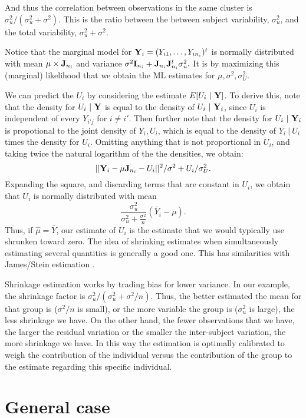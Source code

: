 And thus the correlation between observations in the same cluster is
$\sigma^2_u / (\sigma^2_u + \sigma^2)$. This is the ratio between
the between subject variability, $\sigma^2_u$, and the total variability,
$\sigma^2_u + \sigma^2$. 

Notice that the marginal model for $\mathbf{Y}_i = (Y_{i1}, \ldots, Y_{in_i})^t$ is
normally distributed with mean $\mu \times \mathbf{J}_{n_i}$ and variance 
$
\sigma^2 \mathbf{I}_{n_i} + \mathbf{J}_{n_i} \mathbf{J}_{n_i}^t \sigma^2_{u}. 
$
It is by maximizing this (marginal) likelihood that we obtain the ML estimates 
for $\mu, \sigma^2, \sigma^2_U$. 

We can predict the $U_i$ by considering the estimate $E[U_i ~|~ \mathbf{Y}]$. To derive
this, note that the density for $U_i ~|~ \mathbf{Y}$ is equal to the density 
of $U_i ~|~ \mathbf{Y}_i$, since $U_i$ is independent of every $Y_{i'j}$ for $i \neq i'$. 
Then further note that the density for $U_i ~|~ \mathbf{Y}_i$ is propotional to the
joint density of $Y_i, U_i$, which is equal to the density of $Y_i ~|~ U_i$ 
times the density for $U_i$. Omitting anything that is not proportional
in $U_i$, and taking twice the natural logarithm of the the densities, we obtain:
$$
||\mathbf{Y}_i - \mu \mathbf{J}_{n_i} - U_i ||^2 / \sigma^2 + U_i / \sigma^2_U.
$$
Expanding the square, and discarding terms that are constant in $U_i$,
we obtain that $U_i$ is normally distributed with mean 
$$
\frac{\sigma^2_u}{\sigma^2_u + \frac{\sigma^2}{n}} (\bar Y_i - \mu).
$$
Thus, if $\hat \mu = \bar Y$, our estimate of $U_i$ is the estimate that
we would typically use shrunken toward zero. The idea of shrinking estimates
when simultaneously estimating several quantities is generally a good one.
This has similarities with James/Stein estimation \citep[see this review][]{efron1977stein}.

Shrinkage estimation works by trading bias for lower variance. In our example, 
the shrinkage factor is $\sigma^2_u / (\sigma^2_u + \sigma^2 /n)$. Thus, the
better estimated the mean for that group is ($\sigma^2 / n$ is small), or the more
variable the group is ($\sigma^2_u$ is large), the less shrinkage we have. On the
other hand, the fewer observations that we have, the larger the residual variation
or the smaller the inter-subject variation, the more shrinkage we have. In this
way the estimation is optimally calibrated to weigh the contribution of the individual
versus the contribution of the group to the estimate regarding this specific individual.


\section{General case}

